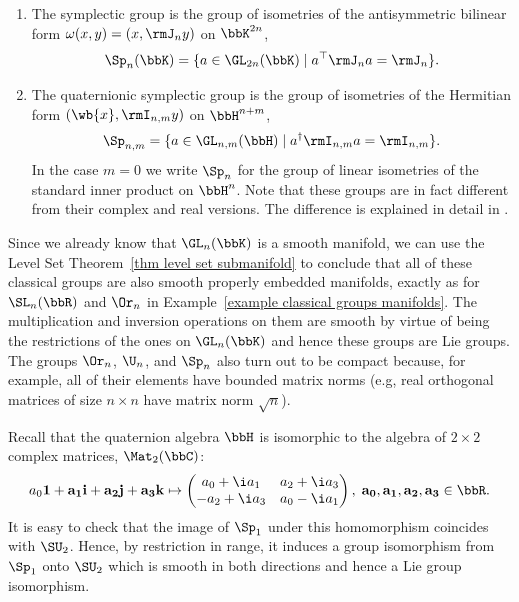 \begin{example}
\begin{enumerate}
        The special unitary group is the subgroup of unimodular unitary transformations
        \[\SU_{n,m}=\U_{n,m}\cap \SL_{n+m}(\bbC).\]
        In the case $m=0$ we write $\SU_n$.
        \item The symplectic group is the group of isometries of the antisymmetric bilinear form $\omega(x,y)=(x,\rmJ_n y)$ on $\bbK^{2n}$,
        \[\Sp_n(\bbK)=\{a\in\GL_{2n}(\bbK)\mid a^\top  \rmJ_n a=\rmJ_n\}.\]
        \item The quaternionic symplectic group is the group of isometries of the Hermitian form $(\wb{x},\rmI_{n,m}y)$ on $\bbH^{n+m}$,
        \[\Sp_{n,m}=\{a\in\GL_{n,m}(\bbH)\mid a^\dagger \rmI_{n,m}a=\rmI_{n,m}\}.\]
        In the case $m=0$ we write $\Sp_n$ for the group of linear isometries of the standard inner product on $\bbH^n$. Note that these groups are in fact different from their complex and real versions. The difference is explained in detail in \cite[pp.~5-6]{Sepanski}.
    \end{enumerate}
\end{example}

Since we already know that $\GL_n(\bbK)$ is a smooth manifold, we can use the Level Set Theorem~\ref{thm level set submanifold} to conclude that all of these classical groups are also smooth properly embedded manifolds, exactly as for $\SL_n(\bbR)$ and $\Or_n$ in Example~\ref{example classical groups manifolds}. The multiplication and inversion operations on them are smooth by virtue of being the restrictions of the ones on $\GL_n(\bbK)$ and hence these groups are Lie groups. The groups $\Or_n$, $\U_n$, and $\Sp_n$ also turn out to be compact because, for example, all of their elements have bounded matrix norms (e.g, real orthogonal matrices of size $n\times n$ have matrix norm $\sqrt{n}$).


\begin{example}[$\SU_2\cong \Sp_1$]
    Recall that the quaternion algebra $\bbH$ is isomorphic to the algebra of $2\times 2$ complex matrices, $\Mat_2(\bbC)$:
    \[a_0 \bf{1}+a_1 \bf{i}+a_2 \bf{j}+a_3 \bf{k}\mapsto
    \begin{pmatrix}
        a_0+\i a_1&a_2+\i a_3\\
        -a_2+\i a_3&a_0-\i a_1
    \end{pmatrix}, \; a_0,a_1,a_2,a_3\in\bbR.\label{46939}
    \]
    It is easy to check that the image of $\Sp_1$ under this homomorphism coincides with $\SU_2$. Hence, by restriction in range, it induces a group isomorphism from $\Sp_1$ onto $\SU_2$ which is smooth in both directions and hence a Lie group isomorphism.
\end{example}

